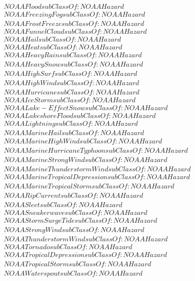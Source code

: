\begin{align}
  NOAAFlood subClassOf: NOAAHazard\\
  NOAAFreezingFog subClassOf: NOAAHazard\\
  NOAAFrostFreeze subClassOf: NOAAHazard\\
  NOAAFunnelCloud subClassOf: NOAAHazard\\
  NOAAHail subClassOf: NOAAHazard\\
  NOAAHeat subClassOf: NOAAHazard\\
  NOAAHeavyRain subClassOf: NOAAHazard\\
  NOAAHeavySnow subClassOf: NOAAHazard\\
  NOAAHighSurf subClassOf: NOAAHazard\\
  NOAAHighWind subClassOf: NOAAHazard\\
  NOAAHurricane subClassOf: NOAAHazard\\
  NOAAIceStorm subClassOf: NOAAHazard\\
  NOAALake-EffectSnow subClassOf: NOAAHazard\\
  NOAALakeshoreFlood subClassOf: NOAAHazard\\
  NOAALightning subClassOf: NOAAHazard\\
  NOAAMarineHail subClassOf: NOAAHazard\\
  NOAAMarineHighWind subClassOf: NOAAHazard\\
  NOAAMarineHurricaneTyphoon subClassOf: NOAAHazard\\
  NOAAMarineStrongWind subClassOf: NOAAHazard\\
  NOAAMarineThunderstormWind subClassOf: NOAAHazard\\
  NOAAMarineTropicalDepression subClassOf: NOAAHazard\\
  NOAAMarineTropicalStorm subClassOf: NOAAHazard\\
  NOAARipCurrent subClassOf: NOAAHazard\\
  NOAASleet subClassOf: NOAAHazard\\
  NOAASneakerwave subClassOf: NOAAHazard\\
  NOAAStormSurgeTide subClassOf: NOAAHazard\\
  NOAAStrongWind subClassOf: NOAAHazard\\
  NOAAThunderstormWind subClassOf: NOAAHazard\\
  NOAATornado subClassOf: NOAAHazard\\
  NOAATropicalDepression subClassOf: NOAAHazard\\
  NOAATropicalStorm subClassOf: NOAAHazard\\
  NOAAWaterspout subClassOf: NOAAHazard\\

\end{align}
